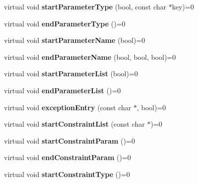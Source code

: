 \begin{DoxyCompactItemize}
virtual void {\bfseries start\+Parameter\+Type} (bool, const char $\ast$key)=0
\item 
\mbox{\label{class_output_generator_a8c701cf1050103eee69d57b409640dea}} 
virtual void {\bfseries end\+Parameter\+Type} ()=0
\item 
\mbox{\label{class_output_generator_ac56057350d3b14b63238bf4325792f82}} 
virtual void {\bfseries start\+Parameter\+Name} (bool)=0
\item 
\mbox{\label{class_output_generator_a69b117731ab42b3985713760b270a1a5}} 
virtual void {\bfseries end\+Parameter\+Name} (bool, bool, bool)=0
\item 
\mbox{\label{class_output_generator_a92e7646944e62d50ede52caa18c39266}} 
virtual void {\bfseries start\+Parameter\+List} (bool)=0
\item 
\mbox{\label{class_output_generator_acc2f021cf85b5cb83716c51e3dc7d44f}} 
virtual void {\bfseries end\+Parameter\+List} ()=0
\item 
\mbox{\label{class_output_generator_a4c4d0ff79434d93b42b8e0c7c42fa5d1}} 
virtual void {\bfseries exception\+Entry} (const char $\ast$, bool)=0
\item 
\mbox{\label{class_output_generator_a745e4b1d9843812a09c4410aa43084b0}} 
virtual void {\bfseries start\+Constraint\+List} (const char $\ast$)=0
\item 
\mbox{\label{class_output_generator_abce5f3b4a1104ca8cea00f19f0d803c0}} 
virtual void {\bfseries start\+Constraint\+Param} ()=0
\item 
\mbox{\label{class_output_generator_afacff7ea600037f0e6fc29207f06332e}} 
virtual void {\bfseries end\+Constraint\+Param} ()=0
\item 
\mbox{\label{class_output_generator_a6f24ed1e9572bbc6de4c533129a4d28a}} 
virtual void {\bfseries start\+Constraint\+Type} ()=0
\item 

\end{DoxyCompactItemize}
